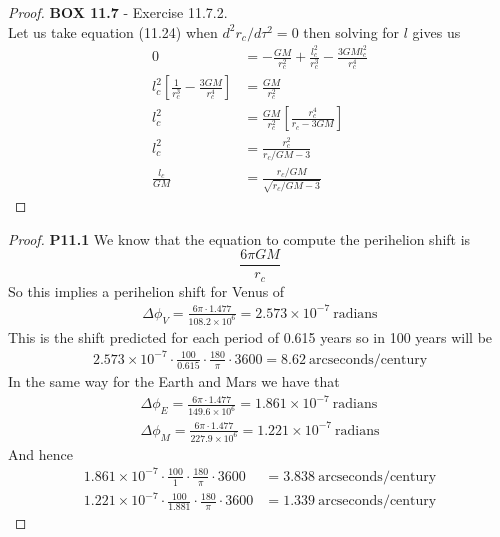 \documentclass[11pt]{article}
\theoremstyle{definition}
\begin{document}
\cleardoublepage
\begin{proof}{\textbf{BOX 11.7} - Exercise 11.7.2.}\\
    Let us take equation (11.24) when $d^2r_c/d\tau^2 = 0$ then solving for
    $l$ gives us
    \begin{align*}
        0 &= -\frac{GM}{r_c^2} + \frac{l_c^2}{r_c^3} - \frac{3GMl_c^2}{r_c^4}\\
        l_c^2\left[\frac{1}{r_c^3} - \frac{3GM}{r_c^4}\right] &=
        \frac{GM}{r_c^2}\\
        l_c^2 &=
        \frac{GM}{r_c^2}\left[\frac{r_c^4}{r_c - 3GM}\right]\\
        l_c^2 &=\frac{r_c^2}{r_c/GM - 3}\\
        \frac{l_c}{GM} &=\frac{r_c/GM}{\sqrt{r_c/GM - 3}}
    \end{align*} 
\end{proof}
\begin{proof}{\textbf{P11.1}}
    We know that the equation to compute the perihelion shift is
    $$\frac{6\pi GM}{r_c}$$
    So this implies a perihelion shift for Venus of
    \begin{align*}
        \Delta\phi_V = \frac{6\pi \cdot 1.477}{108.2 \times 10^6}
        = 2.573\times 10^{-7}~\text{radians}
    \end{align*}
    This is the shift predicted for each period of 0.615 years so in 100 years
    will be
    \begin{align*}
        2.573\times 10^{-7}\cdot \frac{100}{0.615}\cdot\frac{180}{\pi}\cdot3600
        = 8.62~\text{arcseconds/century}
    \end{align*}
    In the same way for the Earth and Mars we have that
    \begin{align*}
        \Delta\phi_E = \frac{6\pi \cdot 1.477}{149.6 \times 10^6}
        = 1.861\times 10^{-7}~\text{radians}\\
        \Delta\phi_M = \frac{6\pi \cdot 1.477}{227.9 \times 10^6}
        = 1.221\times 10^{-7}~\text{radians}
    \end{align*}
    And hence
    \begin{align*}
        1.861\times 10^{-7}\cdot \frac{100}{1}\cdot\frac{180}{\pi}\cdot3600
        &= 3.838~\text{arcseconds/century}\\
        1.221\times 10^{-7}\cdot \frac{100}{1.881}\cdot\frac{180}{\pi}\cdot3600
        &= 1.339~\text{arcseconds/century}
    \end{align*}
\end{proof}
\cleardoublepage
\end{document}
